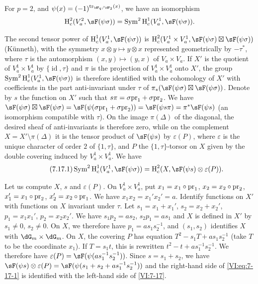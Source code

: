 \begin{proposition_}\label{VI:7-17}
For $p=2$, and $\psi(x)=(-1)^{\tr_{\dF_q/\dF_2}(x)}$, we have an isomorphism 
\[
  \h_c^2(V_a^2,\sF(\psi\sigma)) = \operatorname{Sym}^2 \h_c^1(V_a^1,\sF(\psi\sigma)) \text{.} 
\]
\end{proposition_}

The second tensor power of $\h_c^1(V_a^1,\sF(\psi\sigma))$ is 
$\h_c^2(V_a^1\times V_a^1,\sF(\psi\sigma)\boxtimes \sF(\psi\sigma))$ 
(K\"unneth), with the symmetry $x\otimes y\mapsto y\otimes x$ represented 
geometrically by $-\tau^\ast$, where $\tau$ is the automorphism 
$(x,y)\mapsto (y,x)$ of $V_a\times V_a$. If $X'$ is the quotient of 
$V_a^1\times V_a^1$ by $\{\operatorname{id}{},\tau\}$ and $\pi$ is the 
projection of $V_a^1\times V_a^1$ onto $X'$, the group 
$\operatorname{Sym}^2 \h_c^1(V_a^1,\sF(\psi\sigma))$ is therefore identified with the 
cohomology of $X'$ with coefficients in the part anti-invariant under $\tau$ of 
$\pi_\ast(\sF(\psi\sigma)\boxtimes \sF(\psi\sigma))$. Denote by $s$ the function 
on $X'$ such that $s\pi =\sigma\mathrm{pr}_1+\sigma\mathrm{pr}_2$. We have 
$\sF(\psi\sigma)\boxtimes \sF(\psi\sigma) = \sF(\psi(\sigma\pr_1+\sigma\pr_2)) = \sF(\psi s \pi) = \pi^\ast \sF(\psi s)$ 
(an isomorphism compatible with $\tau$). On the image $\pi(\Delta)$ of the 
diagonal, the desired sheaf of anti-invariants is therefore zero, while on 
the complement $X=X'\setminus \pi(\Delta)$ it is the tensor product of 
$\sF(\psi s)$ by $\varepsilon(P)$, where $\varepsilon$ is the unique character 
of order $2$ of $\{1,\tau\}$, and $P$ the $\{1,\tau\}$-torsor on $X$ given by the 
double covering induced by $V_a^1\times V_a^1$. We have 
\begin{equation*}\tag{7.17.1}\label{VI:eq:7-17-1}
  \operatorname{Sym}^2 \h_c^1(V_a^1,\sF(\psi\sigma)) = \h_c^2(X,\sF(\psi s)\otimes \varepsilon(P)) \text{.}
\end{equation*}

Let us compute $X$, $s$ and $\varepsilon(P)$. On $V_a^1\times V_a^1$, put 
$x_1=x_1\circ\mathrm{pr}_1$, $x_2=x_2\circ\mathrm{pr}_2$, $x_1'=x_1\circ \mathrm{pr}_2$, 
$x_2'=x_2\circ \mathrm{pr}_1$. We have $x_1 x_2=x_1'x_2'=a$. Identify functions on 
$X'$ with functions on $X$ invariant under $\tau$. Let $s_1=x_1+x_1'$, 
$s_2=x_2+x_2'$, $p_1=x_1 x_1'$, $p_2=x_2 x_2'$. We have $s_1 p_2 = a s_2$, 
$s_2 p_1 = a s_1$ and $X$ is defined in $X'$ by $s_1\ne 0$, $s_2\ne 0$. On 
$X$, we therefore have $p_1 = a s_1 s_2^{-1}$, and $(s_1,s_2)$ identifies $X$ with 
$\dG_m\times \dG_m$. On $X$, the covering $P$ has equation 
$T^2-s_1 T+a s_1 s_2^{-1}$ (take $T$ to be the coordinate $x_1$). If 
$T=s_1 t$, this is rewritten $t^2-t+a s_1^{-1} s_2^{-1}$. We therefore have 
$\varepsilon(P) = \sF(\psi(a s_1^{-1} s_2^{-1}))$. Since $s=s_1+s_2$, we have 
$\sF(\psi s)\otimes \varepsilon(P) = \sF(\psi(s_1+s_2+ a s_1^{-1} s_2^{-1}))$ 
and the right-hand side of \eqref{VI:eq:7-17-1} is identified with the left-hand side of 
\ref{VI:7-17}. 


